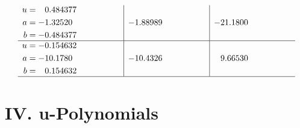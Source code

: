 \documentclass[1p]{elsarticle_modified}
\theoremstyle{definition}
\begin{document}
$$\begin{array}{c|c|c}
\begin{aligned}
u &= \phantom{-}0.484377\phantom{ +0.000000I} \\
a &= -1.32520\phantom{ +0.000000I} \\
b &= -0.484377\phantom{ +0.000000I}\end{aligned}
 & -1.88989\phantom{ +0.000000I} & -21.1800\phantom{ +0.000000I} \\ \hline\begin{aligned}
u &= -0.154632\phantom{ +0.000000I} \\
a &= -10.1780\phantom{ +0.000000I} \\
b &= \phantom{-}0.154632\phantom{ +0.000000I}\end{aligned}
 & -10.4326\phantom{ +0.000000I} & \phantom{-}9.66530\phantom{ +0.000000I}\\
 \hline 
 \end{array}$$\newpage
\newpage\renewcommand{\arraystretch}{1}
\centering \section*{ IV. u-Polynomials}
\end{document}
